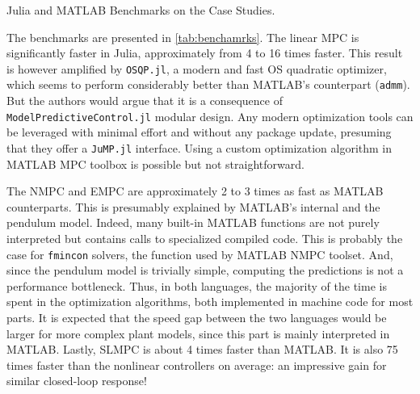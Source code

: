 \begin{table}[t]
    \centering
    \caption{Julia and MATLAB Benchmarks on the Case Studies.}
    \label{tab:benchamrks}
    \vspace{0.5em}
    \centering
    \footnotesize
    
\end{table}

The benchmarks are presented in \cref{tab:benchamrks}. The linear MPC is significantly faster in Julia, approximately from 4 to 16 times faster. This result is however amplified by \texttt{OSQP.jl}, a modern and fast OS quadratic optimizer, which seems to perform considerably better than MATLAB's counterpart (\texttt{admm}). But the authors would argue that it is a consequence of \texttt{ModelPredictiveControl.jl} modular design. Any modern optimization tools can be leveraged with minimal effort and without any package update, presuming that they offer a \texttt{JuMP.jl} interface. Using a custom optimization algorithm in MATLAB MPC toolbox is possible but not straightforward.

The NMPC and EMPC are approximately 2 to 3 times as fast as MATLAB counterparts. This is presumably explained by MATLAB's internal and the pendulum model. Indeed, many built-in MATLAB functions are not purely interpreted but contains calls to specialized compiled code. This is probably the case for \texttt{fmincon} solvers, the function used by MATLAB NMPC toolset. And, since the pendulum model is trivially simple, computing the predictions is not a performance bottleneck. Thus, in both languages, the majority of the time is spent in the optimization algorithms, both implemented in machine code for most parts. It is expected that the speed gap between the two languages would be larger for more complex plant models, since this part is mainly interpreted in MATLAB. Lastly, SLMPC is about 4 times faster than MATLAB. It is also 75 times faster than the nonlinear controllers on average: an impressive gain for similar closed-loop response!
